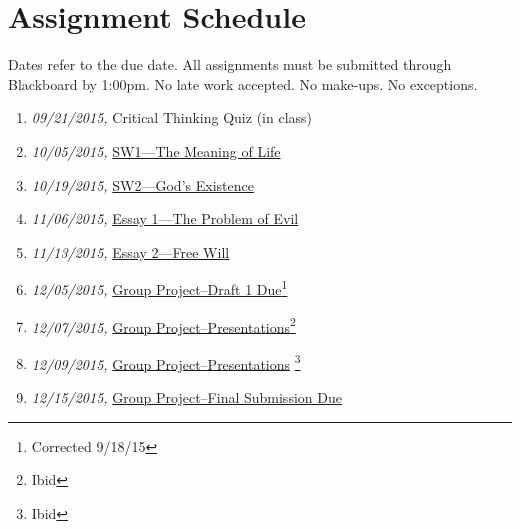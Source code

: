 \documentclass[article,oneside]{memoir}
\begin{document}
\section{Assignment Schedule}
Dates refer to the due date. All assignments must be submitted through Blackboard by 1:00pm. No late work accepted. No make-ups. No exceptions. 

\begin{enumerate}
\item \textit{09/21/2015,} Critical Thinking Quiz (in class)
\item \textit{10/05/2015,} \href{http://scoconno.github.io/Teaching/Examined/Meaning/SW1/}{SW1---The Meaning of Life}
\item \textit{10/19/2015,} \href{http://scoconno.github.io/Teaching/Examined/God/SW2/}{SW2---God's Existence}
\item \textit{11/06/2015,} \href{http://scoconno.github.io/Teaching/Examined/God/Essay1}{Essay 1---The Problem of Evil}
\item \textit{11/13/2015,} \href{http://scoconno.github.io/Teaching/Examined/FreeWill/Essay/}{Essay 2---Free Will}

 \item \textit{12/05/2015,} \href{http://scoconno.github.io/Teaching/Examined/Applied/Group/}{Group Project--Draft 1 Due}\footnote{Corrected 9/18/15}

\item \textit{12/07/2015,} \href{http://scoconno.github.io/Teaching/Examined/Applied/Group/}{Group Project--Presentations}\footnote{Ibid}

\item \textit{12/09/2015,} \href{http://scoconno.github.io/Teaching/Examined/Applied/Group/}{Group Project--Presentations} \footnote{Ibid}

\item \textit{12/15/2015,} \href{http://scoconno.github.io/Teaching/Examined/Applied/Group/}{Group Project--Final Submission Due}

\end{enumerate}




\end{document}
